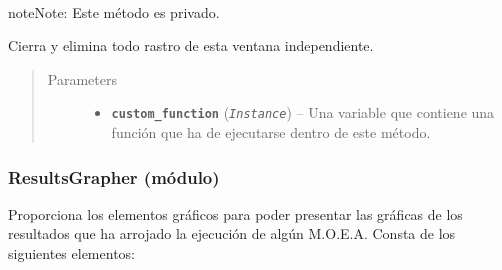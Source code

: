 \documentclass[class=report, crop=false]{standalone}
\begin{document}
\begin{fulllineitems}
\begin{fulllineitems}

~

\begin{notice}{note}{Note:}
Este método es privado.
\end{notice}

Cierra y elimina todo rastro de esta ventana independiente.

\begin{quote}\begin{description}
\item[{Parameters}] \leavevmode\begin{itemize}
\item \textbf{\texttt{custom\_function}} (\emph{\texttt{Instance}}) -- Una variable que contiene una función que ha de 
ejecutarse dentro de este método.
\end{itemize}
\end{description}\end{quote}

\end{fulllineitems}

\end{fulllineitems}

\subsubsection{ResultsGrapher (módulo)}
\label{sec:a_3_3_3}
Proporciona los elementos gráficos para poder presentar
las gráficas de los resultados que ha arrojado la ejecución
de algún M.O.E.A.\medskip\break
Consta de los siguientes elementos:

\end{document}
